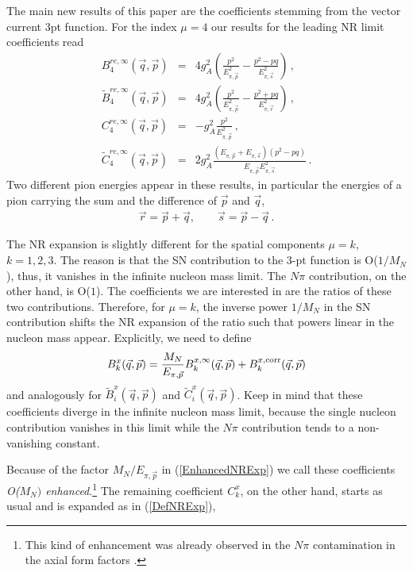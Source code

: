 \documentclass[11pt,prd,aps,showpacs,eqsecnum,floatfix,nofootinbib,preprint,tightenlines]{revtex4}
\newcommand{\pref}[1]{(\ref{#1})}
\newcommand{\Epip}{E_{\pi, \vec{p}}}
\newcommand{\Epir}{E_{\pi,{\vec{r}}}}
\newcommand{\Epis}{E_{\pi,{\vec{s}}}}
\begin{document}
The main new results of this paper are the coefficients stemming from the vector current 3pt function. For the index $\mu=4$ our results for the leading NR limit coefficients read
\begin{eqnarray}
B_4^{re,\infty}(\vec{q},\vec{p}) & =& 4 g_A^2 \left(\frac{p^2}{\Epip^2} - \frac{p^2-pq}{\Epis^2}  \right)\,,\\
\tilde{B}_4^{re,\infty}(\vec{q},\vec{p}) & =& 4 g_A^2 \left(\frac{p^2}{\Epip^2} - \frac{p^2+pq}{\Epir^2}  \right)\,,\\
C_4^{re,\infty}(\vec{q},\vec{p}) & =& - g_A^2 \frac{p^2}{\Epip^2}\,,\\
\tilde{C}_4^{re,\infty}(\vec{q},\vec{p}) & =&2 g_A^2 \frac{(\Epip+\Epis)(p^2-pq)}{\Epip\Epis^2}\,.\label{tildeCre4NRLIM}
\end{eqnarray}
Two different pion energies appear in these results, in particular the energies of a pion carrying the sum and the difference of $\vec{p}$ and $\vec{q}$,
\begin{eqnarray}
\vec{r} = \vec{p} + \vec{q},\qquad \vec{s} = \vec{p} - \vec{q}\,.
\end{eqnarray}

The NR expansion is slightly different for the spatial components $\mu = k$, $k=1,2,3$. The reason is that the SN contribution to the 3-pt function is O($1/M_N$), thus, it vanishes in the infinite nucleon mass limit. The $N\pi$ contribution, on the other hand, is O($1$). The coefficients we are interested in are the ratios of these two contributions. Therefore, for $\mu=k$, the  inverse power $1/M_N$ in the SN contribution shifts the NR expansion of the ratio such that powers linear in the nucleon mass appear. Explicitly, we need to define
\begin{eqnarray}
B_k^{x}(\vec{q},\vec{p})  =  \frac{M_N}{\Epip} B_k^{x,\infty}(\vec{q},\vec{p}) + B_k^{x,{\rm corr}}(\vec{q},\vec{p})\label{EnhancedNRExp}
\end{eqnarray}
and analogously for $\tilde{B}_i^{x}(\vec{q},\vec{p})$ and $\tilde{C}_i^{x}(\vec{q},\vec{p})$. Keep in mind that these coefficients diverge in the infinite nucleon mass limit, because the single nucleon contribution vanishes in this limit while the $N\pi$ contribution tends to a non-vanishing constant. 

Because of the factor $M_N/\Epip$ in \pref{EnhancedNRExp} we call these coefficients {\em O($M_N)$ enhanced}.\footnote{This kind of enhancement was already observed in the $N\pi$ contamination in the axial form factors \cite{Bar:2018xyi}.} The remaining coefficient $C^x_k$, on the other hand, starts as usual and is expanded as in \pref{DefNRExp},
\end{document}
